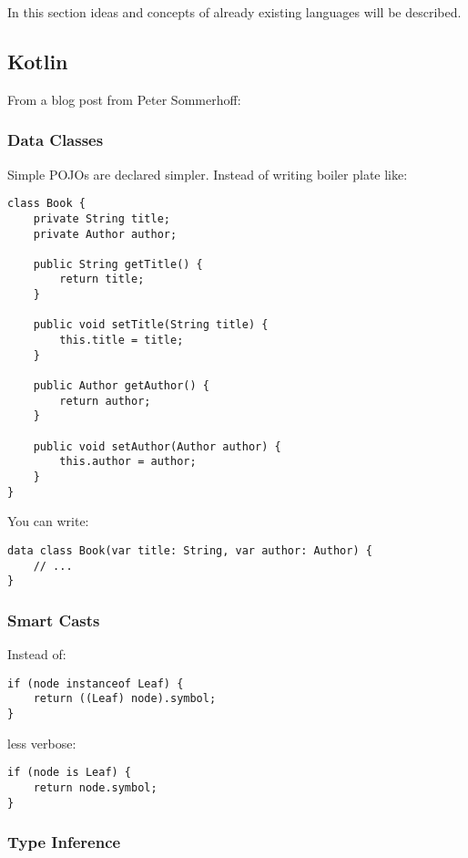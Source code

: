 \documentclass[a4paper,12pt]{article}
\begin{document}
In this section ideas and concepts of already existing languages will be described.

\subsection{Kotlin}

From a blog post from Peter Sommerhoff\cite{kotlin-sommerhoff}:

\subsubsection{Data Classes}

Simple POJOs are declared simpler. Instead of writing boiler plate like:

\begin{verbatim}
class Book {
    private String title;
    private Author author;

    public String getTitle() {
        return title;
    }
    
    public void setTitle(String title) {
        this.title = title;
    }

    public Author getAuthor() {
        return author;
    }
    
    public void setAuthor(Author author) {
        this.author = author;
    }
}
\end{verbatim}

You can write:

\begin{verbatim}
data class Book(var title: String, var author: Author) {
    // ...
}	
\end{verbatim}

\subsubsection{Smart Casts}

Instead of:

\begin{verbatim}
if (node instanceof Leaf) {
    return ((Leaf) node).symbol;
}	
\end{verbatim}

less verbose:

\begin{verbatim}
if (node is Leaf) {
    return node.symbol;
}	
\end{verbatim}

\subsubsection{Type Inference}
\end{document}
